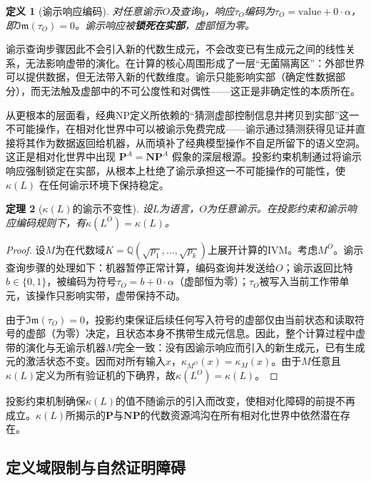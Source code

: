 \documentclass{ctexart}
\newtheorem{theorem}{定理}[section]
\newtheorem{definition}[theorem]{定义}
\newtheorem{proof}[theorem]{证明}
\begin{document}
	\begin{definition}[谕示响应编码]\label{def:oracle-encoding}
		对任意谕示$O$及查询$q$，响应$\tau_O$编码为$\tau_O = \text{value} + 0\cdot\alpha$，即$\mathfrak{Im}(\tau_O)=0$。谕示响应被\textbf{锁死在实部}，虚部恒为零。
	\end{definition}
	
	谕示查询步骤因此不会引入新的代数生成元，不会改变已有生成元之间的线性关系，无法影响虚带的演化。在计算的核心周围形成了一层``无菌隔离区''：外部世界可以提供数据，但无法带入新的代数维度。谕示只能影响实部（确定性数据部分），而无法触及虚部中的不可公度性和对偶性——这正是非确定性的本质所在。
	
	从更根本的层面看，经典NP定义所依赖的“猜测虚部控制信息并拷贝到实部”这一不可能操作，在相对化世界中可以被谕示免费完成——谕示通过猜测获得见证并直接将其作为数据返回给机器，从而填补了经典模型操作不自足所留下的语义空洞。这正是相对化世界中出现 $\mathbf{P}^A = \mathbf{NP}^A$ 假象的深层根源。投影约束机制通过将谕示响应强制锁定在实部，从根本上杜绝了谕示承担这一不可能操作的可能性，使 $\kappa(L)$ 在任何谕示环境下保持稳定。
	
	\begin{theorem}[$\kappa(L)$的谕示不变性]\label{thm:oracle-invariance}
		设$L$为语言，$O$为任意谕示。在投影约束和谕示响应编码规则下，有$\kappa(L^O) = \kappa(L)$。
	\end{theorem}
	\begin{proof}
		设$M$为在代数域$K = \mathbb{Q}(\sqrt{p_1}, \dots, \sqrt{p_k})$上展开计算的IVM。考虑$M^O$。谕示查询步骤的处理如下：机器暂停正常计算，编码查询并发送给$O$；谕示返回比特$b \in \{0,1\}$，被编码为符号$\tau_O = b + 0 \cdot \alpha$（虚部恒为零）；$\tau_O$被写入当前工作带单元，该操作只影响实带，虚带保持不动。
		
		由于$\mathfrak{Im}(\tau_O)=0$，投影约束保证后续任何写入符号的虚部仅由当前状态和读取符号的虚部（为零）决定，且状态本身不携带生成元信息。因此，整个计算过程中虚带的演化与无谕示机器$M$完全一致：没有因谕示响应而引入的新生成元，已有生成元的激活状态不变。因而对所有输入$x$，$\kappa_{M^O}(x) = \kappa_M(x)$。由于$M$任意且$\kappa(L)$定义为所有验证机的下确界，故$\kappa(L^O) = \kappa(L)$。
	\end{proof}
	
	投影约束机制确保$\kappa(L)$的值不随谕示的引入而改变，使相对化障碍的前提不再成立。$\kappa(L)$所揭示的$\mathbf{P}$与$\mathbf{NP}$的代数资源鸿沟在所有相对化世界中依然潜在存在。
	
	\subsection{定义域限制与自然证明障碍}
	
\end{document}
